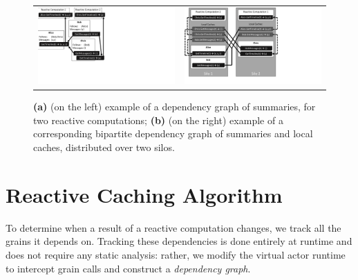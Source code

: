 
\begin{figure}
\centering
\begin{tabular}{cc}
\includegraphics[scale=.45, viewport=-1 164 480 540]{figs/summaries}
&
\includegraphics[scale=.4, viewport=-10 53 656 540]{figs/silos}\\
\end{tabular}
\caption{\textbf{(a)}  (on the left) example of a dependency graph of summaries, for two reactive computations; \textbf{(b)} (on the right) example of a corresponding bipartite dependency graph of summaries and local caches, distributed over two silos.}\label{fig:summaries}
\end{figure}

\section{Reactive Caching Algorithm}\label{sec:algorithm}

To determine when a result of a reactive computation changes, we track all the grains it depends on. Tracking these dependencies is done entirely at runtime and does not require any static analysis: rather, we modify the virtual actor runtime to intercept grain calls and construct a \emph{dependency graph}.

